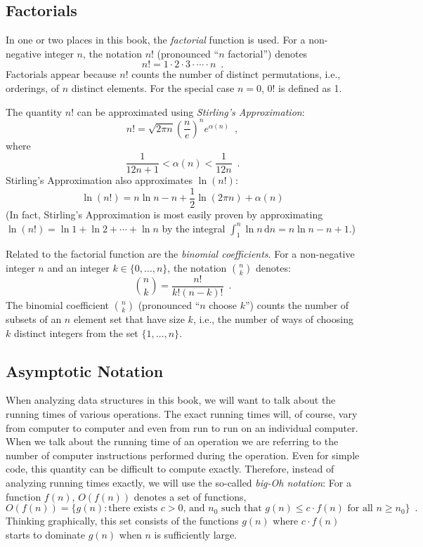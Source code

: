 \subsection{Factorials}

In one or two places in this book, the \emph{factorial} function is used.
For a non-negative integer $n$, the notation $n!$ (pronounced ``$n$ factorial'') denotes
\[
   n! = 1\cdot2\cdot3\cdot\cdots\cdot n \enspace .
\]
Factorials appear because $n!$ counts the number of distinct
permutations, i.e., orderings, of $n$ distinct elements.  For the special case $n=0$, $0!$ is defined as 1. 

The quantity $n!$ can be approximated using \emph{Stirling's Approximation}:
\[
	n! 
   = \sqrt{2\pi n}\left(\frac{n}{e}\right)^{n}e^{\alpha(n)} \enspace ,
\]
where
\[  
   \frac{1}{12n+1} <  \alpha(n) < \frac{1}{12n}  \enspace .
\]
Stirling's Approximation also approximates $\ln(n!)$:
\[
   \ln(n!) = n\ln n - n + \frac{1}{2}\ln(2\pi n) + \alpha(n)
\]
(In fact, Stirling's Approximation is most easily proven by approximating
$\ln(n!)=\ln 1 + \ln 2  + \cdots + \ln n$ by the integral
$\int_1^n \ln n\,\mathrm{d}n = n\ln n - n +1$.)

Related to the factorial function are the \emph{binomial coefficients}.
For a non-negative integer $n$ and an integer $k\in\{0,\ldots,n\}$,
the notation $\binom{n}{k}$ denotes:
\[
   \binom{n}{k} = \frac{n!}{k!(n-k)!} \enspace .
\]
The binomial coefficient $\binom{n}{k}$ (pronounced ``$n$ choose $k$'')
counts the number of subsets of an $n$ element set that have size $k$,
i.e., the number of ways of choosing $k$ distinct integers from the
set $\{1,\ldots,n\}$.

\subsection{Asymptotic Notation}

When analyzing data structures in this book, we will want to talk about
the running times of various operations.  The exact running times will,
of course, vary from computer to computer and even from run to run on an
individual computer.  When we talk about the running time of an operation
we are referring to the number of computer instructions performed during
the operation.  Even for simple code, this quantity can be difficult to compute exactly.
Therefore, instead of analyzing running times
exactly, we will use the so-called \emph{big-Oh notation}: For a 
function $f(n)$, $O(f(n))$ denotes a set of functions,
\[
   O(f(n)) = \{g(n):\mbox{there exists $c>0$, and $n_0$ such that
             $g(n) \le c\cdot f(n)$ for all $n\ge n_0$}   \} \enspace .
\]
Thinking graphically, this set consists of the functions $g(n)$ where
$c\cdot f(n)$ starts to dominate $g(n)$ when $n$ is sufficiently large.

